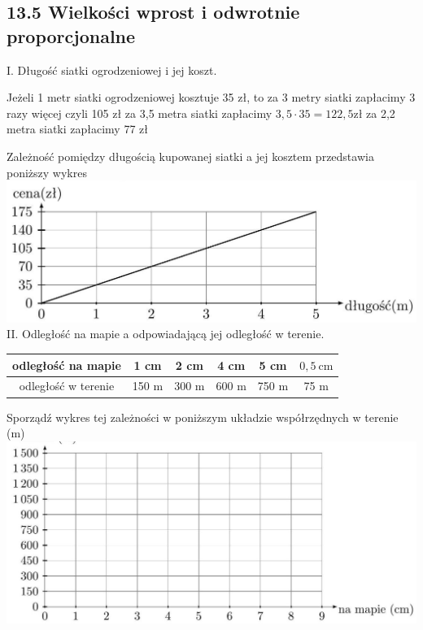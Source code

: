 \documentclass[10pt]{article}
\begin{document}
\subsection*{13.5 Wielkości wprost i odwrotnie proporcjonalne}
I. Długość siatki ogrodzeniowej i jej koszt.

Jeżeli 1 metr siatki ogrodzeniowej kosztuje 35 zł, to za 3 metry siatki zapłacimy 3 razy więcej czyli 105 zł za 3,5 metra siatki zapłacimy \(3,5 \cdot 35=122,5 \mathrm{zł}\) za 2,2 metra siatki zapłacimy 77 zł

Zależność pomiędzy długością kupowanej siatki a jej kosztem przedstawia poniższy wykres\\
\includegraphics[max width=\textwidth, center]{2024_11_21_e9b4faa005d5be2cc318g-132}\\
II. Odległość na mapie a odpowiadającą jej odległość w terenie.

\begin{center}
\begin{tabular}{c|c|c|c|c|c}
odległość na mapie & 1 cm & 2 cm & 4 cm & 5 cm & \(0,5 \mathrm{~cm}\) \\
\hline
odległość w terenie & 150 m & 300 m & 600 m & 750 m & 75 m \\
\hline
\end{tabular}
\end{center}

Sporządź wykres tej zależności w poniższym układzie współrzędnych w terenie (m)\\
\includegraphics[max width=\textwidth, center]{2024_11_21_e9b4faa005d5be2cc318g-132(1)}
\end{document}
